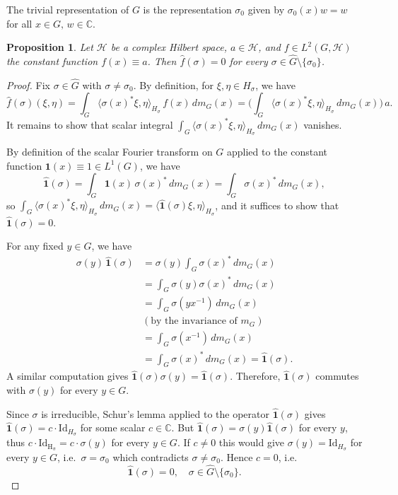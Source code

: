\documentclass[10pt,a4paper]{amsart}
\newtheorem{proposition}[theorem]{Proposition}
\begin{document}
The trivial representation of $G$ is the representation $\sigma_0$ given by  $\sigma_0(x)w=w$ for all $x\in G, \,w\in \mathbb C$. 


\begin{proposition}\label{Claim}
Let $\mathcal{H}$ be a complex Hilbert space,  $a\in \mathcal{H}$, and $f\in L^2(G,\mathcal{H})$ the constant function $f(x)\equiv a$. Then
$\widehat f(\sigma)=0$ for every $\sigma\in\widehat{G}\setminus\{\sigma_0\}$.
\end{proposition}

\begin{proof}
Fix  $\sigma\in\widehat{G}$ with $\sigma\ne\sigma_0$. By definition, for $\xi,\eta\in H_\sigma$,  we have
$$
\widehat f(\sigma)(\xi,\eta)=\int_G\langle\sigma(x)^*\xi,\eta\rangle_{H_\sigma}\,f(x)\,
dm_G(x)=\Big(\int_G\langle\sigma(x)^*\xi,\eta\rangle_{H_\sigma}\,dm_G(x)\Big)\,a.
$$
 It remains to show that scalar integral  $\displaystyle\int_G\langle\sigma(x)^*\xi,
\eta\rangle_{H_\sigma}\,dm_G(x)$ vanishes.

By definition of the scalar Fourier transform
on $G$ applied to the constant function $\mathbf 1(x)\equiv1\in L^1(G)$, we have 
$$
\widehat{\mathbf 1}(\sigma)=\int_G\mathbf 1(x)\,\sigma(x)^*\,dm_G(x)=\int_G\sigma(x)^*\,
dm_G(x),
$$
so $\displaystyle\int_G\langle\sigma(x)^*\xi,\eta\rangle_{H_\sigma}\,dm_G(x)=\langle\widehat{\mathbf1}(\sigma)
\xi,\eta\rangle_{H_\sigma}$, and it suffices to show that $\widehat{\mathbf 1}(\sigma)=0$.

 For any fixed
$y\in G$, we have
\begin{align*}
\sigma(y)\,\hat{\mathbf1}(\sigma)&=\sigma(y)\int_G\sigma(x)^*\,dm_G(x)\\
&=\int_G
\sigma(y)\sigma(x)^*\,dm_G(x)\\
&=\int_G\sigma(y x^{-1})\,dm_G(x)\\
&(\text{by the invariance of } m_G)\\
&=\int_G\sigma(x^{-1})\,dm_G(x)\\
&=\int_G\sigma(x)^*\,dm_G(x)=\widehat{\mathbf 1}(\sigma).
\end{align*}
A similar  computation  gives
$\widehat{\mathbf1}(\sigma)\sigma(y)=\hat{\mathbf1}(\sigma)$. Therefore, 
$\widehat{\mathbf1}(\sigma)$ commutes with $\sigma(y)$ for every $y\in G$. 

 Since $\sigma$ is irreducible, Schur's lemma applied
to the  operator $\widehat{\mathbf1}(\sigma)$  gives
$\widehat{\mathbf1}(\sigma)=c\cdot\mathrm{Id}_{H_\sigma}$ for some scalar $c\in\mathbb C$.
But $\hat{\mathbf 1}(\sigma)=\sigma(y)\hat{\mathbf1}(\sigma)$ for every $y$, thus 
 $c\cdot\mathrm{Id_{H_\sigma}}=c\cdot\sigma(y)$ for every $y\in G$.  If $c\ne0$ this would
give $\sigma(y)=\mathrm{Id}_{H_\sigma}$ for every $y\in G$, i.e.\ $\sigma=\sigma_0$
which contradicts $\sigma\ne\sigma_0$. Hence $c=0$, i.e.
$$
\widehat{\mathbf1}(\sigma)=0,\quad\sigma\in\widehat{G}\setminus\{\sigma_0\}.
$$

\end{proof}
\end{document}
